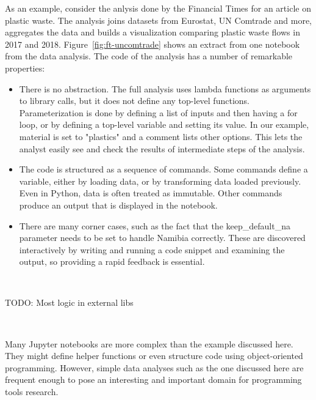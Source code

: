 \documentclass[acmsmall,anonymous,fleqn]{acmart}\settopmatter{printfolios=false,printccs=false,printacmref=false}
\theoremstyle{plain}
\theoremstyle{definition}
\newcommand{\str}[1]{\textnormal{\textcolor{strclr}{\sffamily "#1"}}}
\newcommand{\ident}[1]{\textnormal{\textcolor{idclr}{\sffamily #1}}}
\begin{document}
As an example, consider the anlysis done by the Financial Times for an article on plastic
waste. The analysis joins datasets from Eurostat, UN Comtrade and more, aggregates the data and
builds a visualization comparing plastic waste flows in 2017 and 2018.
Figure~\ref{fig:ft-uncomtrade} shows an extract from one notebook from the data analysis.
The code of the analysis has a number of remarkable properties:
%
\begin{itemize}
\item There is no abstraction. The full analysis uses lambda functions as arguments to library calls,
  but it does not define any top-level functions. Parameterization is done by defining a list of
  inputs and then having a for loop, or by defining a top-level variable and setting its value.
  In our example, \ident{material} is set to \str{plastics} and a comment lists other options.
  This lets the analyst easily see and check the results of intermediate steps of the analysis.

\vspace{0.5em}
\item The code is structured as a sequence of commands. Some commands define a variable, either by
  loading data, or by transforming data loaded previously. Even in Python, data is often treated
  as immutable. Other commands produce an output that is displayed in the notebook.

\vspace{0.5em}
\item There are many corner cases, such as the fact that the \ident{keep\_default\_na} parameter
  needs to be set to handle Namibia correctly. These are discovered interactively by writing and
  running a code snippet and examining the output, so providing a rapid feedback is essential.
\end{itemize}

~

TODO: Most logic in external libs

~

Many Jupyter notebooks are more complex than the example discussed here. They might define
helper functions or even structure code using object-oriented programming. However, simple
data analyses such as the one discussed here are frequent enough to pose an interesting and
important domain for programming tools research.

\end{document}
